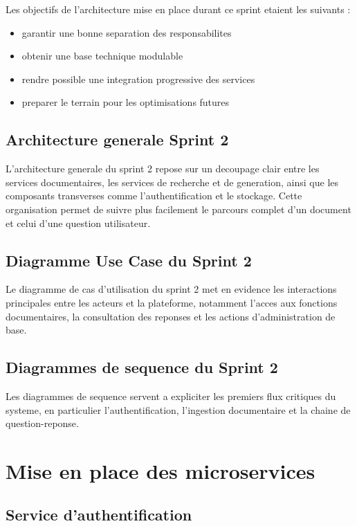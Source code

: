 Les objectifs de l'architecture mise en place durant ce sprint etaient les suivants :

\begin{itemize}
\item garantir une bonne separation des responsabilites
\item obtenir une base technique modulable
\item rendre possible une integration progressive des services
\item preparer le terrain pour les optimisations futures
\end{itemize}

\subsection{Architecture generale Sprint 2}

L'architecture generale du sprint 2 repose sur un decoupage clair entre les services documentaires, les services de recherche et de generation, ainsi que les composants transverses comme l'authentification et le stockage. Cette organisation permet de suivre plus facilement le parcours complet d'un document et celui d'une question utilisateur.

\subsection{Diagramme Use Case du Sprint 2}

Le diagramme de cas d'utilisation du sprint 2 met en evidence les interactions principales entre les acteurs et la plateforme, notamment l'acces aux fonctions documentaires, la consultation des reponses et les actions d'administration de base.

\subsection{Diagrammes de sequence du Sprint 2}

Les diagrammes de sequence servent a expliciter les premiers flux critiques du systeme, en particulier l'authentification, l'ingestion documentaire et la chaine de question-reponse.

\section{Mise en place des microservices}

\subsection{Service d'authentification}

